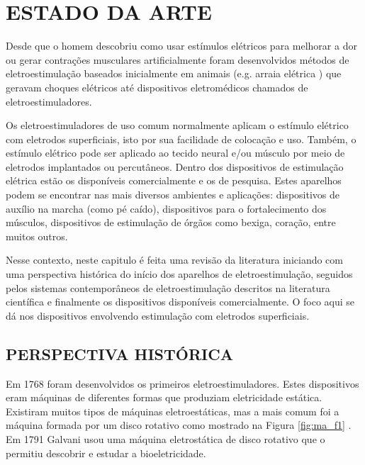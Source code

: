 \chapter{ESTADO DA ARTE}\label{sec:cap3}

\vspace{1cm}
Desde que o homem descobriu como usar estímulos elétricos para melhorar a dor ou gerar contrações musculares artificialmente foram desenvolvidos métodos de eletroestimulação baseados inicialmente em animais (e.g. arraia elétrica \cite{Heidland2013NeuromuscularWaisting}) que geravam choques elétricos até dispositivos eletromédicos chamados de eletroestimuladores. 

Os eletroestimuladores de uso comum normalmente aplicam o estímulo elétrico com eletrodos superficiais, isto por sua facilidade de colocação e uso. Também, o estímulo elétrico pode ser aplicado ao tecido neural e/ou músculo por meio de eletrodos implantados ou percutâneos. Dentro dos dispositivos de estimulação elétrica estão os disponíveis comercialmente e os de pesquisa. Estes aparelhos podem se encontrar nas mais diversos ambientes e aplicações: dispositivos de auxílio na marcha (como pé caído), dispositivos para o fortalecimento dos músculos, dispositivos de estimulação de órgãos como bexiga, coração, entre muitos outros.

Nesse contexto, neste capitulo é feita uma revisão da literatura iniciando com uma perspectiva histórica do início dos aparelhos de eletroestimulação, seguidos pelos sistemas contemporâneos de eletroestimulação descritos na literatura científica e finalmente os dispositivos disponíveis comercialmente. O foco aqui se dá nos dispositivos envolvendo estimulação com eletrodos superficiais.


\section{PERSPECTIVA HISTÓRICA}

Em 1768 foram desenvolvidos os primeiros eletroestimuladores. Estes dispositivos eram máquinas de diferentes formas que produziam eletricidade estática. Existiram muitos tipos de máquinas eletroestáticas, mas a mais comum foi a máquina formada por um disco rotativo como mostrado na Figura \ref{fig:ma_f1} \cite{Geddes1994TheBiology}. Em 1791 Galvani usou uma máquina eletrostática de disco rotativo que o permitiu descobrir e estudar a bioeletricidade.

